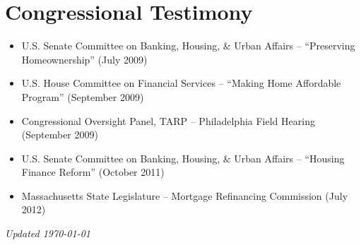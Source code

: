 \documentclass[11pt]{article}
\begin{document}
\section*{Congressional Testimony}
\begin{itemize}[leftmargin=*, nosep]
\item U.S. Senate Committee on Banking, Housing, \& Urban Affairs -- ``Preserving Homeownership'' (July 2009)
\item U.S. House Committee on Financial Services -- ``Making Home Affordable Program'' (September 2009)
\item Congressional Oversight Panel, TARP -- Philadelphia Field Hearing (September 2009)
\item U.S. Senate Committee on Banking, Housing, \& Urban Affairs -- ``Housing Finance Reform'' (October 2011)
\item Massachusetts State Legislature -- Mortgage Refinancing Commission (July 2012)
\end{itemize}

\vfill
\begin{center}
\textit{Updated \today}
\end{center}
\end{document}
